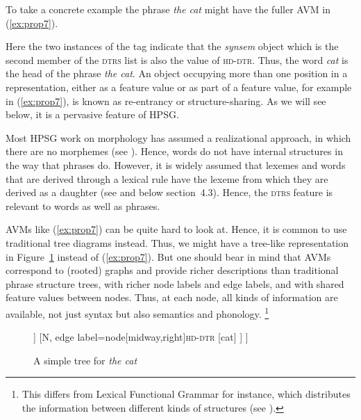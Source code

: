 \documentclass[output=paper
	        ,collection
	        ,collectionchapter
 	        ,biblatex
                ,babelshorthands
                ,newtxmath
                ,draftmode
                ,colorlinks, citecolor=brown
]{langscibook}
\begin{document}
To take a concrete example the phrase \emph{the cat} might have the fuller AVM in (\ref{ex:prop7}).

\ea\label{ex:prop7}
\z

Here the two instances of the tag \avmtmp{\1} indicate that the \emph{synsem} object which is the second member of the \textsc{dtrs} list is also the value of \textsc{hd-dtr}. Thus, the word \emph{cat} is the head of the phrase \emph{the cat}. An object occupying more than one position in a representation, either as a feature value or as part of a feature value, for example \avmtmp{\1} in (\ref{ex:prop7}), is known as re-entrancy or structure-sharing. As we will see below, it is a pervasive feature of HPSG.

Most HPSG work on morphology has assumed a realizational approach, in which there are no morphemes (see ). Hence, words do not have internal structures in the way that phrases do. However, it is widely assumed that lexemes and words that are derived through a lexical rule have the lexeme from which they are derived as a daughter (see  and below section~4.3). Hence, the \textsc{dtrs} feature is relevant to words as well as phrases.

AVMs like (\ref{ex:prop7}) can be quite hard to look at. Hence, it is common to use traditional tree diagrams instead. Thus, we might have a tree-like representation in Figure~\ref{fig:prop2} instead of (\ref{ex:prop7}). But one should bear in mind that AVMs correspond to (rooted) graphs and provide richer descriptions than traditional phrase structure trees, with richer node labels and edge labels, and with shared feature values between nodes. Thus, at each node, all kinds of information are available, not just syntax but also semantics and phonology.%
%
\footnote{This differs from Lexical Functional Grammar for instance, which distributes the information between different kinds of structures (see ).}
%

\begin{figure}
\begin{forest}
[NP
	[Det
		[the]
	]
	[N, edge label={node[midway,right]{\textsc{hd-dtr}}}
		[cat]
	]
]
\end{forest}
	
\caption{A simple tree for \emph{the cat}}\label{fig:prop2}
\end{figure}
\end{document}
